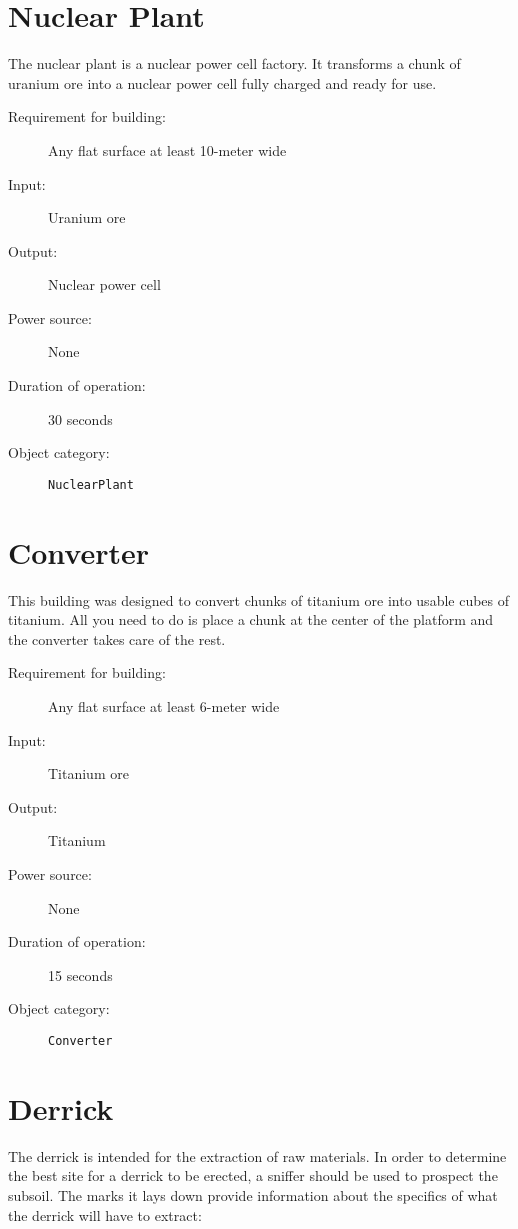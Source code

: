 \section{Nuclear Plant}

The nuclear plant is a nuclear power cell factory. It transforms a chunk of uranium ore into a nuclear power cell fully charged and ready for use.

\begin{description}
    \item[Requirement for building:] Any flat surface at least 10-meter wide
    \item[Input:] Uranium ore
    \item[Output:] Nuclear power cell
    \item[Power source:] None
    \item[Duration of operation:] 30 seconds
    \item[Object category:] \texttt{NuclearPlant}
\end{description}


\section{Converter}

This building was designed to convert chunks of titanium ore into usable cubes of titanium. All you need to do is place a chunk at the center of the platform and the converter takes care of the rest.

\begin{description}
    \item[Requirement for building:] Any flat surface at least 6-meter wide
    \item[Input:] Titanium ore
    \item[Output:] Titanium
    \item[Power source:] None
    \item[Duration of operation:] 15 seconds
    \item[Object category:] \texttt{Converter}
\end{description}


\section{Derrick}

The derrick is intended for the extraction of raw materials. In order to determine the best site for a derrick to be erected, a sniffer should be used to prospect the subsoil. The marks it lays down provide information about the specifics of what the derrick will have to extract:

